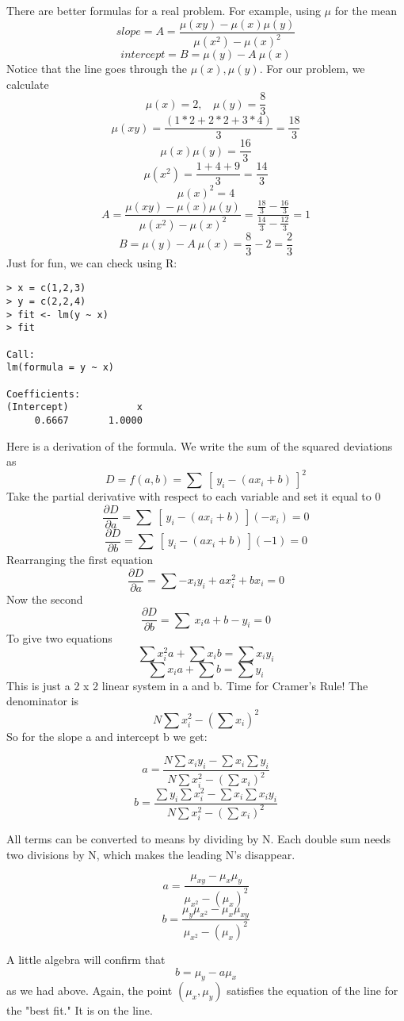 \documentclass[11pt, oneside]{article}
\begin{document}
There are better formulas for a real problem.  For example, using $\mu$ for the mean
\[ slope = A = \frac{\mu(xy) - \mu(x)\mu(y)}{\mu(x^2) - \mu(x)^2} \]
\[ intercept = B = \mu(y) - A \ \mu(x) \]
Notice that the line goes through the $\mu(x), \mu(y)$.  For our problem, we calculate
\[ \mu(x) = 2, \ \ \ \ \mu(y) = \frac{8}{3} \]
\[ \mu(xy) =\frac{(1*2 + 2*2 + 3*4)}{3} = \frac{18}{3}  \]
\[ \mu(x)\mu(y) = \frac{16}{3} \]
\[ \mu(x^2) = \frac{1 + 4 + 9}{3} = \frac{14}{3} \]
\[ \mu(x)^2 = 4 \]
\[ A = \frac{\mu(xy) - \mu(x)\mu(y)}{\mu(x^2) - \mu(x)^2} =\frac{ \frac{18}{3} - \frac{16}{3}}{\frac{14}{3} - \frac{12}{3} }= 1 \]
\[ B = \mu(y) - A \ \mu(x) = \frac{8}{3} - 2 = \frac{2}{3} \]
Just for fun, we can check using R:

\begin{verbatim}
> x = c(1,2,3)
> y = c(2,2,4)
> fit <- lm(y ~ x)
> fit

Call:
lm(formula = y ~ x)

Coefficients:
(Intercept)            x  
     0.6667       1.0000  
\end{verbatim}

Here is a derivation of the formula.  We write the sum of the squared deviations as
\[ D = f(a,b) = \sum \ [ \ y_i - (ax_i + b) \ ]^2 \] 
Take the partial derivative with respect to each variable and set it equal to 0
\[ \frac{\partial D}{\partial a} = \sum \ [ \ y_i - (ax_i + b) \ ](-x_i) = 0 \]
\[ \frac{\partial D}{\partial b} = \sum \ [ \ y_i - (ax_i + b) \ ](-1) = 0 \] 
Rearranging the first equation
\[ \frac{\partial D}{\partial a} = \sum -x_iy_i + ax_i^2 + bx_i  = 0 \]
Now the second
\[ \frac{\partial D}{\partial b} = \sum \ x_ia + b - y_i = 0 \]
To give two equations
\[  \sum x_i^2a + \sum x_ib = \sum  x_iy_i  \]
\[ \sum x_ia + \sum b  = \sum y_i \] 
This is just a 2 x 2 linear system in a and b.  Time for Cramer's Rule!
The denominator is 
\[  N \sum x_i^2 - (\sum x_i)^2  \] 
So for the slope a and intercept b we get:

\[ a = \frac{N \sum  x_iy_i - \sum x_i \sum y_i }{N \sum x_i^2 - (\sum x_i)^2} \]
\[ b =   \frac{\sum y_i \sum x_i^2 -  \sum x_i \sum  x_iy_i }{N \sum x_i^2 - (\sum x_i)^2}   \]

All terms can be converted to means by dividing by N.  Each double sum needs two divisions by N, which makes the leading N's disappear.

\[a = \frac {\mu_{xy} - \mu_x \mu_y }{ \mu_{x^2} - (\mu_x)^2 }  \] 
\[b = \frac {\mu_{y} \mu_{x^2} - \mu_x \mu_{xy} }{ \mu_{x^2} - (\mu_x)^2 }  \] 

A little algebra will confirm that 
\[ b = \mu_y - a \mu_x \]
as we had above.  Again, the point $(\mu_x,\mu_y)$ satisfies the equation of the line for the "best fit."  It is on the line.
\end{document}
